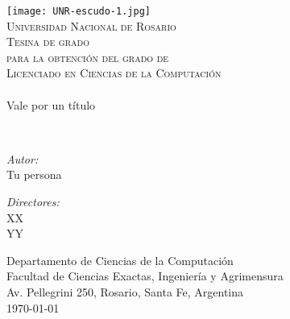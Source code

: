 {%
\thispagestyle{empty}
\begin{center}
	\texttt{[image: UNR-escudo-1.jpg]}
	\\[0.5cm]
	\textsc{\LARGE Universidad Nacional de Rosario}\\[1.5cm]

	\textsc{{\Large Tesina de grado} \\ para la obtención del grado de \\
		Licenciado en Ciencias de la Computaci\'on}\\[0.5cm]
	\HRule{} \\[0.4cm] %
	{\huge Vale por un título
	\\[0.4cm]}

	\HRule{} \\[0.4cm] %
	\noindent
	\begin{minipage}{0.4\textwidth}
		\begin{flushleft} \large
			\emph{Autor:}\\
			Tu persona
		\end{flushleft}
	\end{minipage}%
	\begin{minipage}{0.4\textwidth}
		\begin{flushright} \large
			\emph{Directores:} \\
			XX \\
			YY \\
		\end{flushright}
	\end{minipage}

	\vfill

	Departamento de Ciencias de la Computación\\ Facultad de Ciencias Exactas,
	Ingeniería y Agrimensura\\ Av. Pellegrini 250, Rosario, Santa Fe, Argentina\\[0.4cm]
	{\large \today}

\end{center}
\clearpage
}
